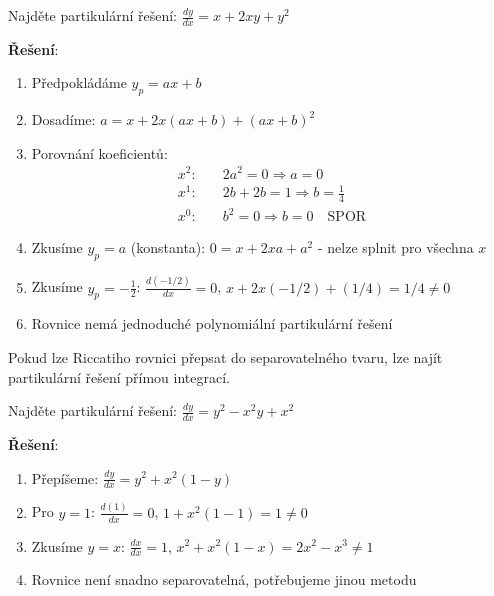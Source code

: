 \vspace{0.6\baselineskip}

\begin{example}
\label{ex:polynomialni-partikularni}
Najděte partikulární řešení: $\frac{dy}{dx} = x + 2xy + y^2$

\textbf{Řešení}:
\begin{enumerate}
\item Předpokládáme $y_p = ax + b$
\item Dosadíme: $a = x + 2x(ax + b) + (ax + b)^2$
\item Porovnání koeficientů:
   \begin{align*}
   x^2: & \quad 2a^2 = 0 \Rightarrow a = 0 \\
   x^1: & \quad 2b + 2b = 1 \Rightarrow b = \frac{1}{4} \\
   x^0: & \quad b^2 = 0 \Rightarrow b = 0 \quad \text{SPOR}
   \end{align*}
\item Zkusíme $y_p = a$ (konstanta): $0 = x + 2xa + a^2$ - nelze splnit pro všechna $x$
\item Zkusíme $y_p = -\frac{1}{2}$: $\frac{d(-1/2)}{dx} = 0$, $x + 2x(-1/2) + (1/4) = 1/4 \neq 0$
\item Rovnice nemá jednoduché polynomiální partikulární řešení
\end{enumerate}
\end{example}

\vspace{0.8\baselineskip}

\begin{method}
\label{met:separace-promennych}
Pokud lze Riccatiho rovnici přepsat do separovatelného tvaru, lze najít partikulární řešení přímou integrací.
\end{method}

\vspace{0.6\baselineskip}

\begin{example}
\label{ex:separovatelny-riccati}
Najděte partikulární řešení: $\frac{dy}{dx} = y^2 - x^2y + x^2$

\textbf{Řešení}:
\begin{enumerate}
\item Přepíšeme: $\frac{dy}{dx} = y^2 + x^2(1 - y)$
\item Pro $y = 1$: $\frac{d(1)}{dx} = 0$, $1 + x^2(1-1) = 1 \neq 0$
\item Zkusíme $y = x$: $\frac{dx}{dx} = 1$, $x^2 + x^2(1-x) = 2x^2 - x^3 \neq 1$
\item Rovnice není snadno separovatelná, potřebujeme jinou metodu
\end{enumerate}
\end{example}

